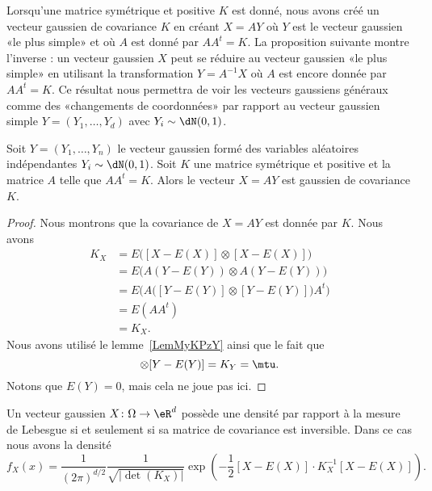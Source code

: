 Lorsqu'une matrice symétrique et positive \( K\) est donné, nous avons créé un vecteur gaussien de covariance \( K\) en créant \( X=AY\) où \( Y\) est le vecteur gaussien «le plus simple» et où \( A\) est donné par \( AA^t=K\). La proposition suivante montre l'inverse : un vecteur gaussien \( X\) peut se réduire au vecteur gaussien «le plus simple» en utilisant la transformation \( Y=A^{-1}X\) où \( A\) est encore donnée par \( AA^t=K\). Ce résultat nous permettra de voir les vecteurs gaussiens généraux comme des «changements de coordonnées» par rapport au vecteur gaussien simple \( Y=(Y_1,\ldots, Y_d)\) avec \( Y_i\sim\dN(0,1)\).

\begin{proposition} \label{PropGacmRi}
	Soit \( Y=(Y_1,\ldots, Y_n)\) le vecteur gaussien formé des variables aléatoires indépendantes \( Y_i\sim\dN(0,1)\). Soit \( K\) une matrice symétrique et positive et la matrice \( A\) telle que \( AA^t=K\). Alors le vecteur \( X=AY\) est gaussien de covariance \( K\).
\end{proposition}

\begin{proof}
	Nous montrons que la covariance de \( X=AY\) est donnée par \( K\). Nous avons
	\begin{subequations}
		\begin{align}
			K_X & =E\big( [X-E(X)]\otimes [X-E(X)] \big)                 \\
			    & =E\big( A(Y-E(Y))\otimes A(Y-E(Y)) \big)               \\
			    & =E\Big( A\big( [Y-E(Y)]\otimes [Y-E(Y)] \big)A^t \Big) \\
			    & =E(AA^t)                                               \\
			    & =K_X.
		\end{align}
	\end{subequations}
	Nous avons utilisé le lemme~\ref{LemMyKPzY} ainsi que le fait que
	\begin{equation}
		[Y-E(Y)]\otimes [Y-E(Y)]=K_Y=\mtu.
	\end{equation}
	Notons que \( E(Y)=0\), mais cela ne joue pas ici.
\end{proof}

\begin{theorem}
	Un vecteur gaussien \( X\colon \Omega\to \eR^d\) possède une densité par rapport à la mesure de Lebesgue si et seulement si sa matrice de covariance est inversible. Dans ce cas nous avons la densité
	\begin{equation}        \label{EqzulwmY}
		f_X(x)=\frac{1}{ (2\pi)^{d/2} }\frac{1}{ \sqrt{| \det(K_X) |} }\exp\left( -\frac{ 1 }{2}[X-E(X)]\cdot K_X^{-1}[X-E(X)] \right).
	\end{equation}
\end{theorem}

